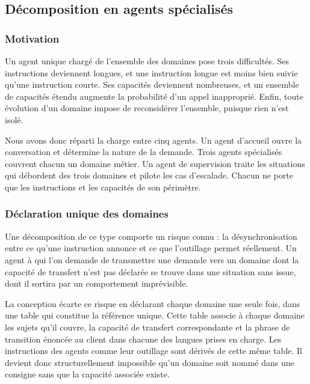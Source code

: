 
\subsection{Décomposition en agents spécialisés}

\subsubsection{Motivation}

Un agent unique chargé de l'ensemble des domaines pose trois difficultés. Ses instructions deviennent longues, et une instruction longue est moins bien suivie qu'une instruction courte. Ses capacités deviennent nombreuses, et un ensemble de capacités étendu augmente la probabilité d'un appel inapproprié. Enfin, toute évolution d'un domaine impose de reconsidérer l'ensemble, puisque rien n'est isolé.

Nous avons donc réparti la charge entre cinq agents. Un agent d'accueil ouvre la conversation et détermine la nature de la demande. Trois agents spécialisés couvrent chacun un domaine métier. Un agent de supervision traite les situations qui débordent des trois domaines et pilote les cas d'escalade. Chacun ne porte que les instructions et les capacités de son périmètre.

\subsubsection{Déclaration unique des domaines}

Une décomposition de ce type comporte un risque connu : la désynchronisation entre ce qu'une instruction annonce et ce que l'outillage permet réellement. Un agent à qui l'on demande de transmettre une demande vers un domaine dont la capacité de transfert n'est pas déclarée se trouve dans une situation sans issue, dont il sortira par un comportement imprévisible.

La conception écarte ce risque en déclarant chaque domaine une seule fois, dans une table qui constitue la référence unique. Cette table associe à chaque domaine les sujets qu'il couvre, la capacité de transfert correspondante et la phrase de transition énoncée au client dans chacune des langues prises en charge. Les instructions des agents comme leur outillage sont dérivés de cette même table. Il devient donc structurellement impossible qu'un domaine soit nommé dans une consigne sans que la capacité associée existe.

